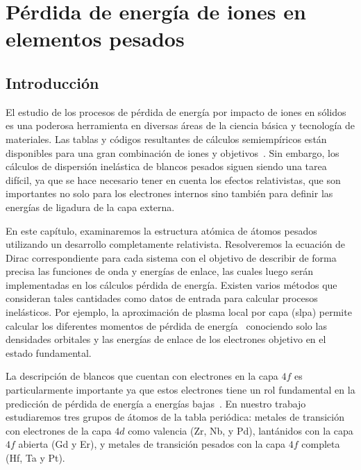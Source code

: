 \chapter{Pérdida de energía de iones en elementos pesados}

\section{Introducción}
\label{sec:intro}

El estudio de los procesos de pérdida de energía por impacto de iones 
en sólidos es una poderosa herramienta en diversas áreas de la ciencia
básica y tecnología de materiales. Las tablas y códigos resultantes de 
cálculos semiempíricos están disponibles para una gran combinación de 
iones y objetivos~\cite{iaea_codes,Paul03}. Sin embargo, los cálculos 
de dispersión inelástica de blancos pesados siguen siendo una tarea 
difícil, ya que se hace necesario tener en cuenta los efectos 
relativistas, que son importantes no solo para los electrones internos 
sino también para definir las energías de ligadura de la capa externa.

En este capítulo, examinaremos la estructura atómica de átomos pesados 
utilizando un desarrollo completamente relativista. Resolveremos la 
ecuación de Dirac correspondiente para cada sistema con el objetivo 
de describir de forma precisa las funciones de onda y energías de 
enlace, las cuales luego serán implementadas en los cálculos pérdida de 
energía. Existen varios métodos que consideran tales cantidades como 
datos de entrada para calcular procesos inelásticos. Por ejemplo, la 
aproximación de plasma local por capa (\acs{slpa}) permite calcular los
diferentes momentos de pérdida de 
energía~\cite{Montanari:13,Montanari:09,Montanari:11,Oswald:18} 
conociendo solo las densidades orbitales y las energías de enlace de 
los electrones objetivo en el estado fundamental.

La descripción de blancos que cuentan con electrones en la capa $4f$ es
particularmente importante ya que estos electrones tiene un rol 
fundamental en la predicción de pérdida de energía a energías 
bajas~\cite{Ro17}. En nuestro trabajo estudiaremos tres grupos de 
átomos de la tabla periódica: metales de transición con electrones de la
capa $4d$ como valencia (Zr, Nb, y Pd), lantánidos con la capa $4f$ 
abierta (Gd y Er), y metales de transición pesados con la capa $4f$ 
completa (Hf, Ta y Pt). 

